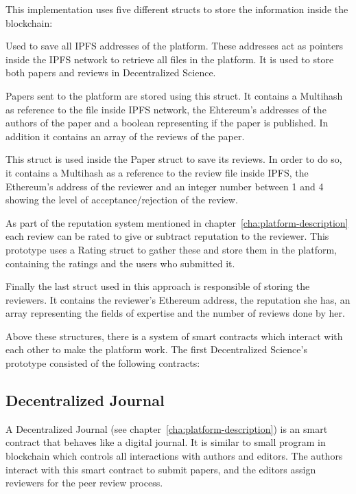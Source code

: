 This implementation uses five different structs to store the information inside
the blockchain:

\begin{itemize}
   Used to save all IPFS addresses of the platform.
  These addresses act as pointers inside the IPFS network to retrieve all files
  in the platform. It is used to store both papers and reviews in Decentralized
  Science.

   Papers sent to the platform are stored using this struct.
  It contains a Multihash as reference to the file inside IPFS network, the
  Ehtereum's addresses of the authors of the paper and a boolean representing if
  the paper is published. In addition it contains an array of the reviews of the
  paper.

   This struct is used inside the Paper struct to save its
  reviews. In order to do so, it contains a Multihash as a reference to the
  review file inside IPFS, the Ethereum's address of the reviewer and an integer
  number between 1 and 4 showing the level of acceptance/rejection of the
  review.

   As part of the reputation system mentioned in
  chapter~\ref{cha:platform-description} each review can be rated to give or
  subtract reputation to the reviewer. This prototype uses a Rating struct to
  gather these and store them in the platform, containing the ratings and the
  users who submitted it.

   Finally the last struct used in this approach is responsible
  of storing the reviewers. It contains the reviewer's Ethereum address, the
  reputation she has, an array representing the fields of expertise and the
  number of reviews done by her.
  
\end{itemize}

Above these structures, there is a system of smart contracts which interact with
each other to make the platform work. The first Decentralized Science's
prototype consisted of the following contracts:

\subsection*{Decentralized Journal}
\label{sec:decentr-journ}

A Decentralized Journal (see chapter~\ref{cha:platform-description}) is an smart
contract that behaves like a digital journal. It is similar to small program in
blockchain which controls all interactions with authors and editors. The authors
interact with this smart contract to submit papers, and the editors assign
reviewers for the peer review process.

